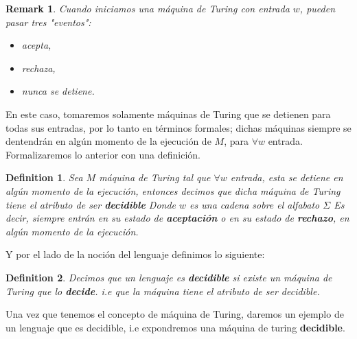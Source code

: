 \documentclass[10pt]{report}
\newtheorem*{remark}{Remark}
\newtheorem{definition}{Definition}
\begin{document}
    \begin{remark}
        Cuando iniciamos una máquina de Turing con entrada $w$, pueden pasar tres "eventos":
        \begin{itemize}
            \item acepta,
            \item rechaza,
            \item nunca se detiene.
        \end{itemize}
    \end{remark}
    En este caso, tomaremos solamente máquinas de Turing que se detienen para todas sus entradas,
    por lo tanto en términos formales; dichas máquinas siempre se dentendrán en algún momento de la
    ejecución de $M$, para $\forall w$ entrada.
    Formalizaremos lo anterior con una definición.
    \begin{definition}
        Sea $M$ máquina de Turing tal que $\forall w$ entrada, esta se detiene en algún momento de la ejecución,
        entonces decimos que dicha máquina de Turing tiene el atributo de ser
        \textbf{decidible}\newline
        Donde $w$ es una cadena sobre el alfabato $\Sigma$
        Es decir, siempre entrán en su estado de \textbf{aceptación}
        o en su estado de \textbf{rechazo}, en algún momento de la ejecución.
    \end{definition}
    Y por el lado de la noción del lenguaje definimos lo siguiente:
    \begin{definition}
        Decimos que un lenguaje es \textbf{decidible} si existe un máquina de Turing
        que lo \textbf{decide}.
        i.e que la máquina tiene el atributo de ser decidible.
    \end{definition}
    Una vez que tenemos el concepto de máquina de Turing, daremos un ejemplo de un lenguaje que es decidible,
    i.e expondremos una máquina de turing \textbf{decidible}.
\end{document}
